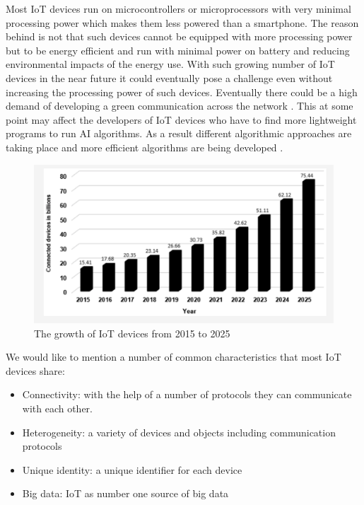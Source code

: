 Most IoT devices run on microcontrollers or microprocessors with very minimal processing power which makes them less powered than a smartphone. The reason behind is not that such devices cannot be equipped with more processing power but to be energy efficient and run with minimal power on battery and reducing environmental impacts of the energy use. With such growing number of IoT devices in the near future it could eventually pose a challenge even without increasing the processing power of such devices. Eventually there could be a high demand of developing a green communication across the network \cite{7057878}. This at some point may affect the developers of IoT devices who have to find more lightweight programs to run AI algorithms. As a result different algorithmic approaches are taking place and more efficient algorithms are being developed \cite{8057306}.






\begin{figure}[!htb]
    \centering
    \includegraphics[width=1\textwidth]{figures/number_of_iot.png}
    \caption{The growth of IoT devices from 2015 to 2025 \cite{bdcc4040028}}
    \label{fig:num_of_iot}
\end{figure}


We would like to mention a number of common characteristics that most IoT devices share: 

\begin{itemize}
    \item Connectivity:  with the help of a number of protocols they can communicate with each other.
    \item Heterogeneity: a variety of devices and objects including communication protocols
    \item Unique identity: a unique identifier for each device 
    \item Big data: IoT as number one source of big data 
\end{itemize}

